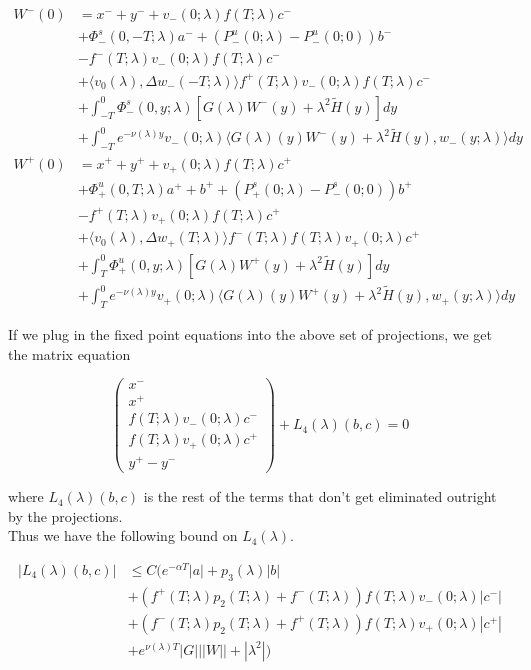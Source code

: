 \documentclass[12pt]{article}
\begin{document}
\begin{enumerate}
\begin{align*}
W^-(0) &= x^- + y^- + v_-(0; \lambda) f(T; \lambda) c^- \\
&+\Phi^s_-(0, -T; \lambda )a^- + (P^u_-(0; \lambda) - P^u_-(0; 0))b^- \\
&- f^-(T; \lambda) v_-(0; \lambda) f(T; \lambda) c^- \\
&+ \langle v_0(\lambda), \Delta w_-(-T; \lambda) \rangle 
f^+(T; \lambda) v_-(0; \lambda) f(T; \lambda) c^- \\
&+ \int_{-T}^0 \Phi^s_-(0, y; \lambda) [ G(\lambda)W^-(y) + \lambda^2 \tilde{H}(y) ] dy \\
&+ \int_{-T}^0 
e^{-\nu(\lambda)y} v_-(0; \lambda) \langle G(\lambda)(y)W^-(y) + \lambda^2 \tilde{H}(y), w_-(y; \lambda) \rangle dy \\
W^+(0) &= x^+ + y^+ + v_+(0; \lambda) f(T; \lambda) c^+ \\
&+\Phi^u_+(0, T; \lambda)a^+ + b^+ + (P^s_+(0; \lambda) - P^s_-(0; 0))b^+ \\
&- f^+(T; \lambda) v_+(0; \lambda) f(T; \lambda) c^+ \\
&+ \langle v_0(\lambda), \Delta w_+(T; \lambda) \rangle 
f^-(T; \lambda)f(T; \lambda) v_+(0; \lambda) c^+ \\
&+ \int_T^0 \Phi^u_+(0, y; \lambda) [ G(\lambda)W^+(y) + \lambda^2 \tilde{H}(y) ] dy \\
&+ \int_T^0 e^{-\nu(\lambda)y} v_+(0; \lambda) \langle G(\lambda)(y)W^+(y) + \lambda^2 \tilde{H}(y), w_+(y; \lambda) \rangle dy
\end{align*}


If we plug in the fixed point equations into the above set of projections, we get the matrix equation

\[
\begin{pmatrix}x^- \\ x^+ \\ 
f(T; \lambda) v_-(0; \lambda) c^- \\
f(T; \lambda) v_+(0; \lambda) c^+ \\
y^+ - y^- \end{pmatrix} + L_4(\lambda)(b, c) = 0
\]

where $L_4(\lambda)(b, c)$ is the rest of the terms that don't get eliminated outright by the projections.
\\

Thus we have the following bound on $L_4(\lambda)$. 

\begin{align*}
|L_4(\lambda)(b, c)| &\leq C( e^{-\alpha T}|a| + p_3(\lambda)|b| \\ 
&+ (f^+(T; \lambda) p_2(T; \lambda) + f^-(T; \lambda)) f(T; \lambda) v_-(0; \lambda) |c^-| \\
&+ (f^-(T; \lambda) p_2(T; \lambda) + f^+(T; \lambda)) f(T; \lambda) v_+(0; \lambda) |c^+| \\
&+ e^{\nu(\lambda)T}|G|||W|| + |\lambda^2|)
\end{align*}


\end{enumerate}
\end{document}
